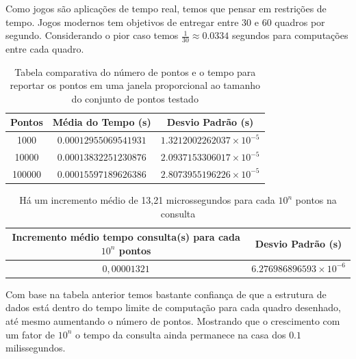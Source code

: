 Como jogos são aplicações de tempo real, temos que pensar em restrições de tempo. Jogos modernos tem objetivos de entregar entre 30 e 60 quadros por segundo. Considerando o pior caso temos $\frac{1}{30} \approx 0.0334$ segundos para computações entre cada quadro.

\begin{table}[h!]
\centering
\begin{tabular}{|c c c |} 
 \hline
 Pontos & Média do Tempo (s) & Desvio Padrão (s) \\%
 \hline
 1000  & $0.00012955069541931$  & $1.3212002262037\times 10^{-5}$ \\
\hline
 10000  & $0.00013832251230876$  & $2.0937153306017\times 10^{-5}$ \\
\hline
 100000  & $0.00015597189626386$  & $2.8073955196226\times 10^{-5}$ \\
\hline
\end{tabular}
\caption{Tabela comparativa do número de pontos e o tempo para reportar os pontos em uma janela proporcional ao tamanho do conjunto de pontos testado}
\label{table:1}
\end{table}
\begin{table}[h!]
\centering
\begin{tabular}{|c c |} 
 \hline
 Incremento médio tempo consulta(s) para cada $10^{n} $ pontos & Desvio Padrão (s) \\%
 \hline
 $0,00001321$  & $ 6.276986896593 \times 10^{-6}$ \\
\hline
\end{tabular}
\caption{Há um incremento médio de 13,21 microssegundos para cada $10^{n}$ pontos na consulta }
\label{table:1}
\end{table}

Com base na tabela anterior temos bastante confiança de que a estrutura de dados está dentro do tempo limite de computação para cada quadro desenhado, até mesmo aumentando o número de pontos. Mostrando que o crescimento com um fator de $10^n$ o tempo da consulta ainda permanece na casa dos $0.1$ milissegundos.

